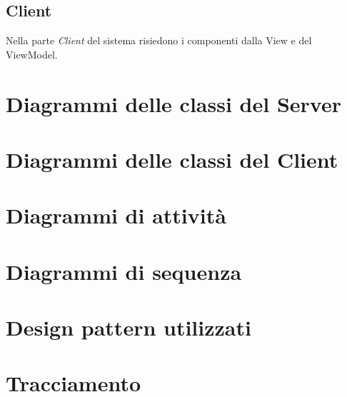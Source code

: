 \documentclass[a4paper,11pt]{article}
\begin{document}
		\subsection{Client}
		Nella parte \emph{Client} del sistema risiedono i componenti dalla View e del ViewModel.
			
			
	
	\section{Diagrammi delle classi del Server}
		
	\section{Diagrammi delle classi del Client}
		
		
	
	\section{Diagrammi di attività}
		
	\section{Diagrammi di sequenza}
		
	\section{Design pattern utilizzati}
		
	
	\section{Tracciamento}
		
		
	
\end{document}
